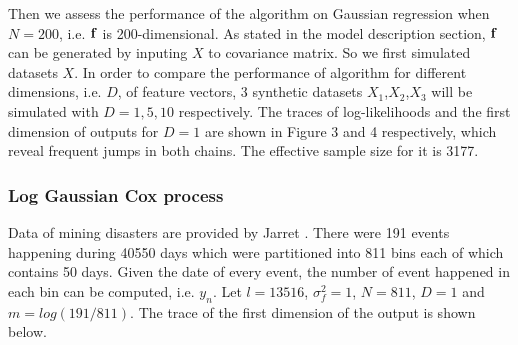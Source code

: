 \documentclass{article}
\begin{document}

Then we assess the performance of the algorithm on Gaussian regression when $N=200$, i.e. $\bf{f}$ is 200-dimensional. As stated in the model description section, $\bf{f}$ can be generated by inputing $X$ to covariance matrix. So we first simulated datasets $X$. In order to compare the performance of algorithm for different dimensions, i.e. $D$, of feature vectors, 3 synthetic datasets $X_1$,$X_2$,$X_3$ will be simulated with $D = 1,5,10$ respectively. 
The traces of log-likelihoods and the first dimension of outputs for $D=1$ are shown in Figure 3 and 4 respectively, which reveal frequent jumps in both chains. The effective sample size for it is 3177.

\subsubsection{Log Gaussian Cox process}

Data of mining disasters are provided by Jarret \cite{Jarrett}. There were 191 events happening during 40550 days which were partitioned into 811 bins each of which contains 50 days. Given the date of every event, the number of event happened in each bin can be computed, i.e. $y_n$. Let $l=13516$, $\sigma_f^2 = 1$, $N = 811$, $D=1$ and $m=log(191/811)$. The trace of the first dimension of the output is shown below.
\end{document}

